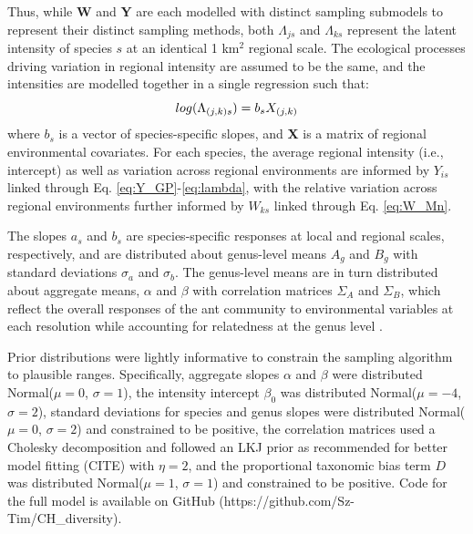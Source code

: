 \documentclass[preprint,review,times,12pt]{elsarticle}
\begin{document}
Thus, while \textbf{W} and \textbf{Y} are each modelled with distinct sampling submodels to represent their distinct sampling methods, both $\Lambda_{js}$ and $\Lambda_{ks}$ represent the latent intensity of species $s$ at an identical 1 km$^2$ regional scale. The ecological processes driving variation in regional intensity are assumed to be the same, and the intensities are modelled together in a single regression such that:
    \begin{equation}
        log(\Lambda_{(j,k)s}) = b_s X_{(j,k)} \\
        \label{eq:LAMBDA}
    \end{equation}
where $b_s$ is a vector of species-specific slopes, and \textbf{X} is a matrix of regional environmental covariates. For each species, the average regional intensity (i.e., intercept) as well as variation across regional environments are informed by $Y_{is}$ linked through Eq. \ref{eq:Y_GP}-\ref{eq:lambda}, with the relative variation across regional environments further informed by $W_{ks}$ linked through Eq. \ref{eq:W_Mn}.  

The slopes $a_s$ and $b_s$ are species-specific responses at local and regional scales, respectively, and are distributed about genus-level means $A_g$ and $B_g$ with standard deviations $\sigma_a$ and $\sigma_b$. The genus-level means are in turn distributed about aggregate means, $\alpha$ and $\beta$ with correlation matrices $\Sigma_A$ and $\Sigma_B$, which reflect the overall responses of the ant community to environmental variables at each resolution while accounting for relatedness at the genus level \citep{Hadfield2010b,Szewczyk2018}.

Prior distributions were lightly informative to constrain the sampling algorithm to plausible ranges. Specifically, aggregate slopes $\alpha$ and $\beta$ were distributed Normal($\mu=0$, $\sigma=1$), the intensity intercept $\beta_0$ was distributed Normal($\mu=-4$, $\sigma=2$), standard deviations for species and genus slopes were distributed Normal($\mu=0$, $\sigma=2$) and constrained to be positive, the correlation matrices used a Cholesky decomposition and followed an LKJ prior as recommended for better model fitting (CITE) with $\eta=2$, and the proportional taxonomic bias term $D$ was distributed Normal($\mu=1$, $\sigma=1$) and constrained to be positive. Code for the full model is available on GitHub (https://github.com/Sz-Tim/CH\_diversity).
\end{document}
